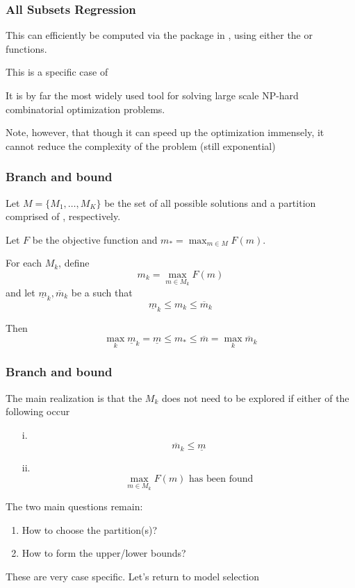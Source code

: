 \documentclass{beamer}
\begin{document}
\begin{frame}[fragile]
\frametitle{All Subsets Regression}
This can efficiently be computed via the  package in , using either the 
 or  functions.

\vsp
This is a specific case of 

\vsp

It is by far the most widely used tool for solving large scale NP-hard combinatorial optimization problems.

\vsp
Note, however, that though it can speed up the optimization immensely, it cannot reduce the complexity
of the problem (still exponential)


\end{frame}

\begin{frame}[fragile]
\frametitle{Branch and bound}
Let $M = \{M_1,\ldots,M_K\}$ be the set of all possible solutions and a partition comprised of , respectively.  



\vsp

Let $F$ be the objective function and $m_* = \max_{m \in M} F(m)$.

\vsp
For each $M_k$, define
\[
m_k = \max_{m \in M_k} F(m) 
\]
and let $\underline{m}_k, \overline{m}_k $ be a  such that
\[
 \underline{m}_k \leq m_k \leq \overline{m}_k 
\]
\vsp

Then
\[
\max_k \underline{m}_k = \underline{m} \leq m_* \leq \overline{m} = \max_k \overline{m}_k
\]
\end{frame}

\begin{frame}[fragile]
\frametitle{Branch and bound}
The main realization is that the  $M_k$ does not need to be explored if
either of the following occur
\begin{itemize}
\item[i.] 
\[
\overline{m}_k \leq \underline{m}
\]
\item[ii.] 
\[
\max_{m \in M_k} F(m) \textrm{ has been found}
\]
\end{itemize}

The two main questions remain:
\begin{enumerate}
\item How to choose the partition(s)?
\item How to form the upper/lower bounds?
\end{enumerate}


These are very case specific.  Let's return to model selection
\end{frame}
\end{document}
